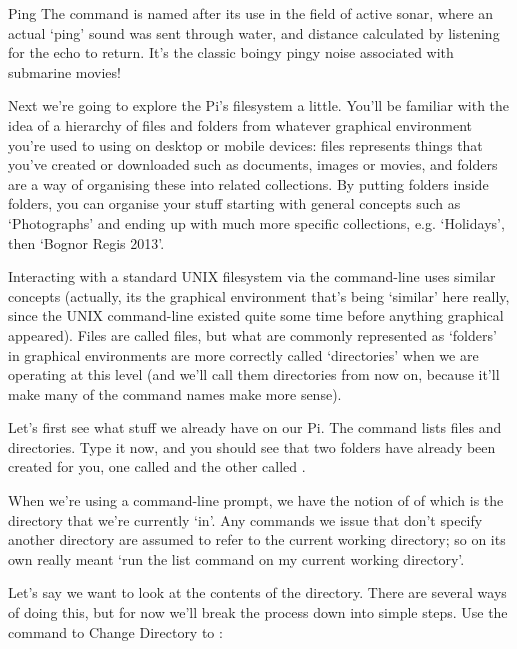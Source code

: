 \begin{diversion}{Ping}
  The  command is named after its use in the field of active sonar, where an actual `ping' sound was sent through water, and distance calculated by listening for the echo to return. It's the classic boingy pingy noise associated with submarine movies! 
\end{diversion}

Next we're going to explore the Pi's filesystem a little. You'll be familiar with the idea of a hierarchy of files and folders from whatever graphical environment you're used to using on desktop or mobile devices: files represents things that you've created or downloaded such as documents, images or movies, and folders are a way of organising these into related collections. By putting folders inside folders, you can organise your stuff starting with general concepts such as `Photographs' and ending up with much more specific collections, e.g. `Holidays', then `Bognor Regis 2013'. 

Interacting with a standard UNIX filesystem via the command-line uses similar concepts (actually, its the graphical environment that's being `similar' here really, since the UNIX command-line existed quite some time before anything graphical appeared). Files are called files, but what are commonly represented as `folders' in graphical environments are more correctly called `directories' when we are operating at this level (and we'll call them directories from now on, because it'll make many of the command names make more sense). 

Let's first see what stuff we already have on our Pi. The  command lists files and directories. Type it now, and you should see that two folders have already been created for you, one called  and the other called . 


When we're using a command-line prompt, we have the notion of of  which is the directory that we're currently `in'. Any commands we issue that don't specify another directory are assumed to refer to the current working directory; so  on its own really meant `run the list command on my current working directory'. 

Let's say we want to look at the contents of the  directory. There are several ways of doing this, but for now we'll break the process down into simple steps. Use the  command to Change Directory to :

